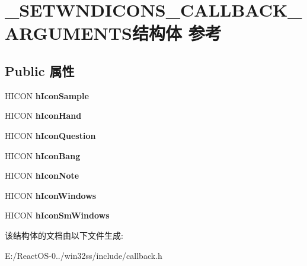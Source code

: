 \hypertarget{struct___s_e_t_w_n_d_i_c_o_n_s___c_a_l_l_b_a_c_k___a_r_g_u_m_e_n_t_s}{}\section{\+\_\+\+S\+E\+T\+W\+N\+D\+I\+C\+O\+N\+S\+\_\+\+C\+A\+L\+L\+B\+A\+C\+K\+\_\+\+A\+R\+G\+U\+M\+E\+N\+T\+S结构体 参考}
\label{struct___s_e_t_w_n_d_i_c_o_n_s___c_a_l_l_b_a_c_k___a_r_g_u_m_e_n_t_s}
\subsection*{Public 属性}
\begin{DoxyCompactItemize}
\item 
\mbox{\label{struct___s_e_t_w_n_d_i_c_o_n_s___c_a_l_l_b_a_c_k___a_r_g_u_m_e_n_t_s_af2d5e1d779506e0fa010d9cffe522ee6}} 
H\+I\+C\+ON {\bfseries h\+Icon\+Sample}
\item 
\mbox{\label{struct___s_e_t_w_n_d_i_c_o_n_s___c_a_l_l_b_a_c_k___a_r_g_u_m_e_n_t_s_a7dc0e33bee124eca2a77d17e9d3276c5}} 
H\+I\+C\+ON {\bfseries h\+Icon\+Hand}
\item 
\mbox{\label{struct___s_e_t_w_n_d_i_c_o_n_s___c_a_l_l_b_a_c_k___a_r_g_u_m_e_n_t_s_abde8627a34efbd063d7845ba5e3d09ed}} 
H\+I\+C\+ON {\bfseries h\+Icon\+Question}
\item 
\mbox{\label{struct___s_e_t_w_n_d_i_c_o_n_s___c_a_l_l_b_a_c_k___a_r_g_u_m_e_n_t_s_a58fe1ab24e8e6c76766fbf2da224e420}} 
H\+I\+C\+ON {\bfseries h\+Icon\+Bang}
\item 
\mbox{\label{struct___s_e_t_w_n_d_i_c_o_n_s___c_a_l_l_b_a_c_k___a_r_g_u_m_e_n_t_s_a3b4a1e07ad1147994e1f32bbb785bacf}} 
H\+I\+C\+ON {\bfseries h\+Icon\+Note}
\item 
\mbox{\label{struct___s_e_t_w_n_d_i_c_o_n_s___c_a_l_l_b_a_c_k___a_r_g_u_m_e_n_t_s_a93cde5703f0fba5b99765ad83d44f56b}} 
H\+I\+C\+ON {\bfseries h\+Icon\+Windows}
\item 
\mbox{\label{struct___s_e_t_w_n_d_i_c_o_n_s___c_a_l_l_b_a_c_k___a_r_g_u_m_e_n_t_s_a52a86b5aa8320af19b16da455b98807e}} 
H\+I\+C\+ON {\bfseries h\+Icon\+Sm\+Windows}
\end{DoxyCompactItemize}


该结构体的文档由以下文件生成\+:\begin{DoxyCompactItemize}
\item 
E\+:/\+React\+O\+S-\/0../win32ss/include/callback.\+h\end{DoxyCompactItemize}
